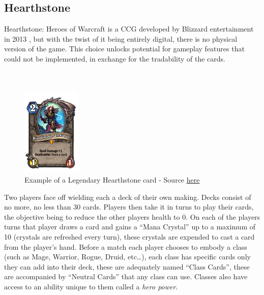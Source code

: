 \documentclass{report}
\begin{document}
\subsection{Hearthstone}
	Hearthstone: Heroes of Warcraft is a CCG developed by Blizzard entertainment in 2013 \cite{HS}, but with the twist of it being entirely digital, there is no physical version of the game. This choice unlocks potential for gameplay features that could not be implemented, in exchange for the tradability of the cards. \\ \\ \\
\begin{figure}[h]
\centering
\includegraphics[width=0.25\textwidth]{thalnos}
\caption{Example of a Legendary Hearthstone card - Source \href{https://www.pinterest.fr/pin/573716440004576557/}{here}
\label{card}
}
\end{figure}

	\indent Two players face off wielding each a deck of their own making. Decks consist of no more, no less than 30 cards. Players then take it in turns to play their cards, the objective being to reduce the other players health to 0. On each of the players turns that player draws a card and gains a “Mana Crystal” up to a maximum of 10 (crystals are refreshed every turn), these crystals are expended to cast a card from the player's hand. Before a match each player chooses to embody a class (such as Mage, Warrior, Rogue, Druid, etc…), each class has specific cards only they can add into their deck, these are adequately named “Class Cards”, these are accompanied by “Neutral Cards” that any class can use. Classes also have access to an ability unique to them called a {\it{hero power}}. \\
	
\end{document}
